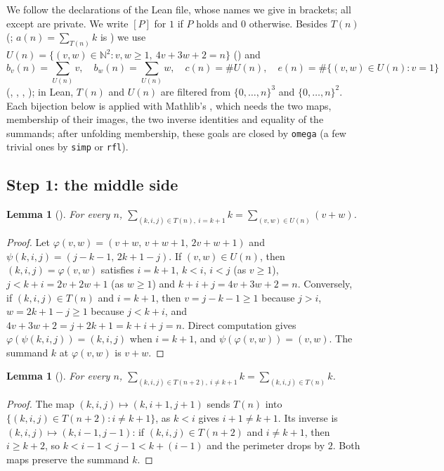 \documentclass[11pt]{amsart}
\theoremstyle{plain}
\newtheorem{lemma}[theorem]{Lemma}
\theoremstyle{definition}
\newcommand{\N}{\mathbb{N}}
\begin{document}
We follow the declarations of the Lean file, whose names we give in brackets; all except  are private.
We write $[P]$ for $1$ if $P$ holds and $0$ otherwise.
Besides $T(n)$ (; $a(n)=\sum_{T(n)}k$ is ) we use $U(n)=\{(v,w)\in\N^2 : v,w\ge1,\ 4v+3w+2=n\}$ () and
\[
  b_v(n)=\sum_{U(n)}v,\quad b_w(n)=\sum_{U(n)}w,\quad c(n)=\#U(n),\quad e(n)=\#\{(v,w)\in U(n): v=1\}
\]
(, , , ); in Lean, $T(n)$ and $U(n)$ are filtered from $\{0,\dots,n\}^3$ and $\{0,\dots,n\}^2$.
Each bijection below is applied with Mathlib's , which needs the two maps, membership of their images, the two inverse identities and equality of the summands; after unfolding membership, these goals are closed by \texttt{omega} (a few trivial ones by \texttt{simp} or \texttt{rfl}).

\subsection*{Step 1: the middle side}

\begin{lemma}[]\label{lem:tight}
For every $n$, $\displaystyle\sum_{(k,i,j)\in T(n),\ i=k+1}k=\sum_{(v,w)\in U(n)}(v+w)$.
\end{lemma}

\begin{proof}
Let $\varphi(v,w)=(v+w,\,v+w+1,\,2v+w+1)$ and $\psi(k,i,j)=(j-k-1,\,2k+1-j)$.
If $(v,w)\in U(n)$, then $(k,i,j)=\varphi(v,w)$ satisfies $i=k+1$, $k<i$, $i<j$ (as $v\ge1$), $j<k+i=2v+2w+1$ (as $w\ge1$) and $k+i+j=4v+3w+2=n$.
Conversely, if $(k,i,j)\in T(n)$ and $i=k+1$, then $v=j-k-1\ge1$ because $j>i$, $w=2k+1-j\ge1$ because $j<k+i$, and $4v+3w+2=j+2k+1=k+i+j=n$.
Direct computation gives $\varphi(\psi(k,i,j))=(k,i,j)$ when $i=k+1$, and $\psi(\varphi(v,w))=(v,w)$.
The summand $k$ at $\varphi(v,w)$ is $v+w$.
\end{proof}

\begin{lemma}[]\label{lem:loose}
For every $n$, $\displaystyle\sum_{(k,i,j)\in T(n+2),\ i\ne k+1}k=\sum_{(k,i,j)\in T(n)}k$.
\end{lemma}

\begin{proof}
The map $(k,i,j)\mapsto(k,i+1,j+1)$ sends $T(n)$ into $\{(k,i,j)\in T(n+2): i\ne k+1\}$, as $k<i$ gives $i+1\ne k+1$.
Its inverse is $(k,i,j)\mapsto(k,i-1,j-1)$: if $(k,i,j)\in T(n+2)$ and $i\ne k+1$, then $i\ge k+2$, so $k<i-1<j-1<k+(i-1)$ and the perimeter drops by $2$.
Both maps preserve the summand $k$.
\end{proof}
\end{document}
